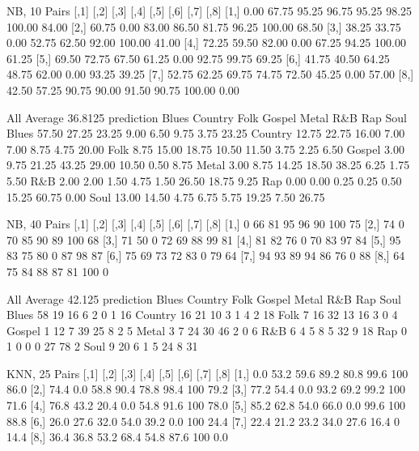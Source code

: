 \documentclass[a4paper,oneside]{article}
\begin{document}
NB, 10
Pairs
      [,1]  [,2]  [,3]  [,4]  [,5]  [,6]   [,7]  [,8]
[1,]  0.00 67.75 95.25 96.75 95.25 98.25 100.00 84.00
[2,] 60.75  0.00 83.00 86.50 81.75 96.25 100.00 68.50
[3,] 38.25 33.75  0.00 52.75 62.50 92.00 100.00 41.00
[4,] 72.25 59.50 82.00  0.00 67.25 94.25 100.00 61.25
[5,] 69.50 72.75 67.50 61.25  0.00 92.75  99.75 69.25
[6,] 41.75 40.50 64.25 48.75 62.00  0.00  93.25 39.25
[7,] 52.75 62.25 69.75 74.75 72.50 45.25   0.00 57.00
[8,] 42.50 57.25 90.75 90.00 91.50 90.75 100.00  0.00

All
Average 36.8125
prediction Blues Country  Folk Gospel Metal   R\&B   Rap  Soul
   Blues   57.50   27.25 23.25   9.00  6.50  9.75  3.75 23.25
   Country 12.75   22.75 16.00   7.00  7.00  8.75  4.75 20.00
   Folk     8.75   15.00 18.75  10.50 11.50  3.75  2.25  6.50
   Gospel   3.00    9.75 21.25  43.25 29.00 10.50  0.50  8.75
   Metal    3.00    8.75 14.25  18.50 38.25  6.25  1.75  5.50
   R\&B      2.00    2.00  1.50   4.75  1.50 26.50 18.75  9.25
   Rap      0.00    0.00  0.25   0.25  0.50 15.25 60.75  0.00
   Soul    13.00   14.50  4.75   6.75  5.75 19.25  7.50 26.75

NB, 40
Pairs
     [,1] [,2] [,3] [,4] [,5] [,6] [,7] [,8]
[1,]    0   66   81   95   96   90  100   75
[2,]   74    0   70   85   90   89  100   68
[3,]   71   50    0   72   69   88   99   81
[4,]   81   82   76    0   70   83   97   84
[5,]   95   83   75   80    0   87   98   87
[6,]   75   69   73   72   83    0   79   64
[7,]   94   93   89   94   86   76    0   88
[8,]   64   75   84   88   87   81  100    0

All
Average 42.125
prediction Blues Country Folk Gospel Metal R\&B Rap Soul
   Blues      58      19   16      6     2   0   1   16
   Country    16      21   10      3     1   4   2   18
   Folk        7      16   32     13    16   3   0    4
   Gospel      1      12    7     39    25   8   2    5
   Metal       3       7   24     30    46   2   0    6
   R\&B         6       4    5      8     5  32   9   18
   Rap         0       1    0      0     0  27  78    2
   Soul        9      20    6      1     5  24   8   31

KNN, 25
Pairs
     [,1] [,2] [,3] [,4] [,5] [,6] [,7] [,8]
[1,]  0.0 53.2 59.6 89.2 80.8 99.6  100 86.0
[2,] 74.4  0.0 58.8 90.4 78.8 98.4  100 79.2
[3,] 77.2 54.4  0.0 93.2 69.2 99.2  100 71.6
[4,] 76.8 43.2 20.4  0.0 54.8 91.6  100 78.0
[5,] 85.2 62.8 54.0 66.0  0.0 99.6  100 88.8
[6,] 26.0 27.6 32.0 54.0 39.2  0.0  100 24.4
[7,] 22.4 21.2 23.2 34.0 27.6 16.4    0 14.4
[8,] 36.4 36.8 53.2 68.4 54.8 87.6  100  0.0
\end{document}
